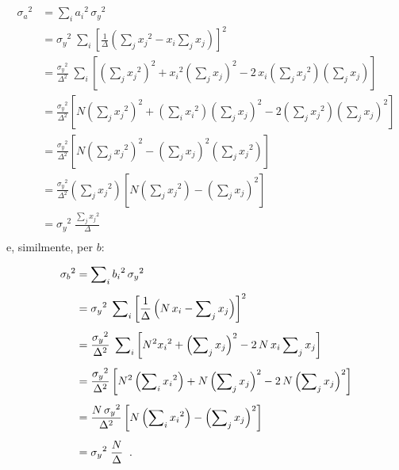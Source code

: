 \begin{align*}
  {\sigma_a}^2 &= \sum\nolimits_i {a_i}^2 \,
    {\sigma_y}^2 \\[2ex]
  &= {\sigma_y}^2 \; \sum\nolimits_i \left[
    \frac{1}{\Delta} \left( \sum\nolimits_j {x_j}^2 -
    x_i \sum\nolimits_j x_j \right) \right] ^2 \\[2ex]
  &= \frac{{\sigma_y}^2}{\Delta^2} \; \sum\nolimits_i
    \left[ \left( \sum\nolimits_j {x_j}^2 \right) ^2 +
    {x_i}^2 \left( \sum\nolimits_j x_j \right) ^2 - 2
    \, x_i \left( \sum\nolimits_j {x_j}^2 \right)
    \left( \sum\nolimits_j x_j \right) \right]
    \\[2ex]
  &= \frac{{\sigma_y}^2}{\Delta^2} \left[ N \left(
    \sum\nolimits_j {x_j}^2 \right) ^2 \! + \left(
    \sum\nolimits_i {x_i}^2 \right) \left( \sum\nolimits_j
    x_j \right) ^2 \! - 2 \left( \sum\nolimits_j
    {x_j}^2 \right) \left( \sum\nolimits_j x_j \right) ^2
    \right] \\[2ex]
  &= \frac{{\sigma_y}^2}{\Delta^2} \left[ N \left(
    \sum\nolimits_j {x_j}^2 \right) ^2 - \left(
    \sum\nolimits_j x_j \right) ^2 \left( \sum\nolimits_j
    {x_j}^2 \right) \right] \\[2ex]
  &= \frac{{\sigma_y}^2}{\Delta^2} \left(
    \sum\nolimits_j {x_j}^2 \right) \left[ N \left(
    \sum\nolimits_j {x_j}^2 \right) - \left(
    \sum\nolimits_j x_j \right) ^2 \right] \\[2ex]
  &= {\sigma_y}^2 \; \frac{\sum_j {x_j}^2 }{\Delta} \\
\end{align*}
e, similmente, per $b$:

\begin{align*}
  {\sigma_b}^2 &= \sum\nolimits_i {b_i}^2 \,
    {\sigma_y}^2 \\[1ex]
  &= {\sigma_y}^2 \; \sum\nolimits_i \left[
    \frac{1}{\Delta} \left( N \, x_i - \sum\nolimits_j
    x_j \right) \right] ^2 \\[1ex]
  &= \frac{{\sigma_y}^2}{\Delta^2} \; \sum\nolimits_i \left[
    N^2 {x_i}^2 + \left( \sum\nolimits_j x_j \right) ^2
    - 2 \, N \, x_i \sum\nolimits_j x_j \right] \\[1ex]
  &= \frac{{\sigma_y}^2}{\Delta^2} \left[ N^2 \left(
    \sum\nolimits_i {x_i}^2 \right) + N \left(
    \sum\nolimits_j x_j \right) ^2 - 2 \, N \left(
    \sum\nolimits_j x_j \right) ^2 \right] \\[1ex]
  &= \frac{N \, {\sigma_y}^2}{\Delta^2} \left[ N
    \left( \sum\nolimits_i {x_i}^2 \right) - \left(
    \sum\nolimits_j x_j \right) ^2 \right] \\[1ex]
  &= {\sigma_y}^2 \; \frac{N}{\Delta} \;\; .
\end{align*}

